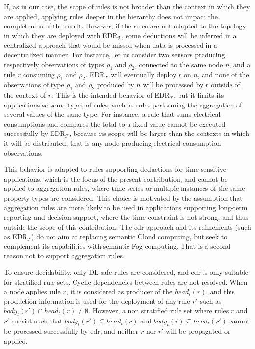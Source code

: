 \documentclass{iosart2c}
\newcommand{\edrt}{EDR$_{\mathcal{T}}$\xspace}
\begin{document}
If, as in our case, the scope of rules is not broader than the context in which they are applied, applying rules deeper in the hierarchy does not impact the completeness of the result.
However, if the rules are not adapted to the topology in which they are deployed with \edrt, some deductions will be inferred in a centralized approach that would be missed when data is processed in a decentralized manner. 
For instance, let us consider two sensors producing respectively observations of types $\rho_1$ and $\rho_2$, connected to the same node $n$, and a rule $r$ consuming $\rho_1$ and $\rho_2$.
\edrt will eventually deploy $r$ on $n$, and none of the observations of type $\rho_1$ and $\rho_2$ produced by $n$ will be processed by $r$ outside of the context of $n$.
This is the intended behavior of \edrt, but it limits its applications so some types of rules, such as rules performing the aggregation of several values of the same type.
For instance, a rule that sums electrical consumptions and compares the total to a fixed value cannot be executed successfully by \edrt, because its scope will be larger than the contexts in which it will be distributed, that is any node producing electrical consumption observations.

This behavior is adapted to rules supporting deductions for time-sensitive applications, which is the focus of the present contribution, and cannot be applied to aggregation rules, where time series or multiple instances of the same property types are considered.
This choice is motivated by the assumption that aggregation rules are more likely to be used in applications supporting long-term reporting and decision support, where the time constraint is not strong, and thus outside the scope of this contribution.
The \gls{edr} approach and its refinements (such as \edrt) do not aim at replacing semantic Cloud computing, but seek to complement its capabilities with semantic Fog computing. 
That is a second reason not to support aggregation rules.

To ensure decidability, only DL-safe rules are considered, and \gls{edr} is only suitable for stratified rule sets. 
Cyclic dependencies between rules are not resolved.
When a node applies rule $r$, it is considered as producer of the $head_t(r)$, and this production information is used for the deployment of any rule $r'$ such as $body_t(r')\cap head_t(r)\neq \emptyset$.
However, a non stratified rule set where rules $r$ and $r'$ coexist such that $body_t(r')\subseteq head_t(r)$ and $body_t(r)\subseteq head_t(r')$ cannot be processed successfully by \gls{edr}, and neither $r$ nor $r'$ will be propagated or applied.
\end{document}
